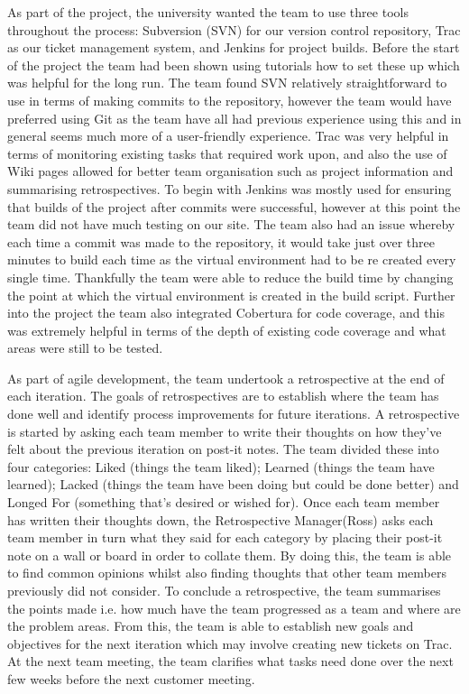 \documentclass{l3proj}
\begin{document}
As part of the project, the university wanted the team to use three tools throughout the process: Subversion (SVN) for our version control
repository, Trac as our ticket management system, and Jenkins for project builds. Before the start of the project the team had been
shown using tutorials how to set these up which was helpful for the long run. The team found SVN relatively straightforward to use
in terms of making commits to the repository, however the team would have preferred using Git as the team have all
had previous experience using this and in general seems much more of a user-friendly experience. Trac was very helpful in
terms of monitoring existing tasks that required work upon, and also the use of Wiki pages allowed for better team organisation
such as project information and summarising retrospectives. To begin with Jenkins was mostly used for ensuring that builds of
the project after commits were successful, however at this point the team did not have much testing on our site. The team also had an issue
whereby each time a commit was made to the repository, it would take just over three minutes to build each time as the virtual
environment had to be re created every single time. Thankfully the team were able to reduce the build time by changing the point at
which the virtual environment is created in the build script. Further into the project the team also integrated Cobertura for code
coverage, and this was extremely helpful in terms of the depth of existing code coverage and what areas were still to be tested.

As part of agile development, the team undertook a retrospective at the end of each iteration. The goals of retrospectives are
to establish where the team has done well and identify process improvements for future iterations. A retrospective is started
by asking each team member to write their thoughts on how they've felt about the previous iteration on post-it notes.
The team divided these into four categories: Liked (things the team liked); Learned (things the team have learned);
Lacked (things the team have been doing but could be done better) and Longed For (something that's desired or wished for).
Once each team member has written their thoughts down, the Retrospective Manager(Ross) asks each team member in turn
what they said for each category by placing their post-it note on a wall or board in order to collate them. By doing this,
the team is able to find common opinions whilst also finding thoughts that other team members previously did not
consider. To conclude a retrospective, the team summarises the points made i.e. how much have the team progressed as a team
and where are the problem areas. From this, the team is able to establish new goals and objectives for the next iteration
which may involve creating new tickets on Trac. At the next team meeting, the team clarifies what tasks need done over
the next few weeks before the next customer meeting.
\end{document}
